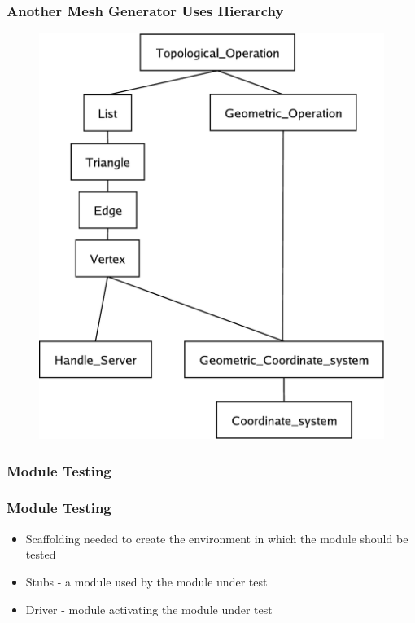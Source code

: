 \documentclass[t, 12pt, numbers, fleqn, handout]{beamer}
\begin{document}

\begin{frame}
\frametitle{Another Mesh Generator Uses Hierarchy \cite{ElSheikhEtAl2004}}
\begin{figure}[H]
\includegraphics[scale=0.345]{../Figures/hierarchy_diagram.pdf}
\end{figure}
\end{frame}


\begin{frame}
\frametitle{Module Testing}


\end{frame}


\begin{frame}
\frametitle{Module Testing \cite{GhezziEtAl2003}}

\begin{itemize}

\item Scaffolding needed to create the environment in which the module should be
  tested
\item Stubs - a module used by the module under test
\item Driver - module activating the module under test
\end{itemize}

\end{frame}
\end{document}

